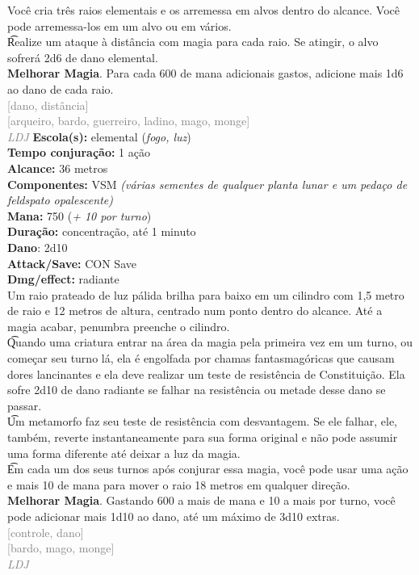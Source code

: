 \documentclass{RPG_Adventure}[2021/10/20]
\begin{document}
{\normalsize Você cria três raios elementais e os arremessa em alvos dentro do alcance. Você pode arremessa-los em um alvo ou em vários.\\\t Realize um ataque à distância com magia para cada raio. Se atingir, o alvo sofrerá 2d6 de dano elemental.\\\t \textbf{Melhorar Magia}. Para cada 600 de mana adicionais gastos, adicione mais 1d6 ao dano de cada raio.\\}
{\scriptsize \textcolor{gray}{[dano, distância]\\}}
{\scriptsize \textcolor{gray}{[arqueiro, bardo, guerreiro, ladino, mago, monge]\\}}
{\tiny \textcolor{gray}{\textit{LDJ}}}\jump{}
{\small \t \textbf{Escola(s):} elemental (\textit{fogo, luz})\\\t \textbf{Tempo conjuração:} 1 ação\\\t \textbf{Alcance:} 36 metros\\\t \textbf{Componentes:} VSM \textit{(várias sementes de qualquer planta lunar e um pedaço de feldspato opalescente)}\\\t \textbf{Mana:} 750 (\textit{+ 10 por turno})\\\t \textbf{Duração:} concentração, até 1 minuto\\\t \textbf{Dano}: 2d10\\\t \textbf{Attack/Save:} CON Save\\\t \textbf{Dmg/effect:} radiante\\}
{\normalsize Um raio prateado de luz pálida brilha para baixo em um cilindro com 1,5 metro de raio e 12 metros de altura, centrado num ponto dentro do alcance. Até a magia acabar, penumbra preenche o cilindro.\\\t Quando uma criatura entrar na área da magia pela primeira vez em um turno, ou começar seu turno lá, ela é engolfada por chamas fantasmagóricas que causam dores lancinantes e ela deve realizar um teste de resistência de Constituição. Ela sofre 2d10 de dano radiante se falhar na resistência ou metade desse dano se passar.\\\t Um metamorfo faz seu teste de resistência com desvantagem. Se ele falhar, ele, também, reverte instantaneamente para sua forma original e não pode assumir uma forma diferente até deixar a luz da magia.\\\t Em cada um dos seus turnos após conjurar essa magia, você pode usar uma ação e mais 10 de mana para mover o raio 18 metros em qualquer direção.\\\t \textbf{Melhorar Magia}. Gastando 600 a mais de mana e 10 a mais por turno, você pode adicionar mais 1d10 ao dano, até um máximo de 3d10 extras.\\}
{\scriptsize \textcolor{gray}{[controle, dano]\\}}
{\scriptsize \textcolor{gray}{[bardo, mago, monge]\\}}
{\tiny \textcolor{gray}{\textit{LDJ}}}\jump

\end{document}
